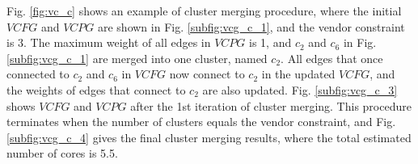 \documentclass[10pt,journal, compsoc]{IEEEtran}
\begin{document}
Fig. \ref{fig:vc_c} shows an example of cluster merging procedure, where the initial $VCFG$ and $VCPG$ are shown in Fig. \ref{subfig:vcg_c_1}, and the vendor constraint is 3. The maximum weight of all edges in $VCPG$ is 1, and $c_2$ and $c_6$ in Fig. \ref{subfig:vcg_c_1} are merged into one cluster, named $c_2$. All edges that once connected to $c_2$ and $c_6$ in $VCFG$ now connect to $c_2$ in the updated $VCFG$, and the weights of edges that connect to $c_2$ are also updated. Fig. \ref{subfig:vcg_c_3} shows $VCFG$ and $VCPG$ after the 1st iteration of cluster merging. This procedure terminates when the number of clusters equals the vendor constraint, and Fig. \ref{subfig:vcg_c_4} gives the final cluster merging results, where the total estimated number of cores is 5.5.





\end{document}
